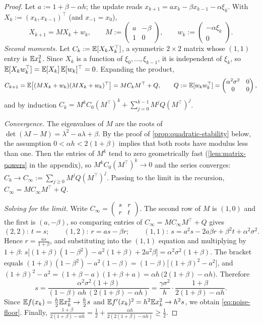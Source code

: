 \begin{proof}
Let $a:=1+\beta-\alpha h$; the update reads $x_{k+1}=ax_k-\beta x_{k-1}-\alpha\xi_k$. With
$X_k:=(x_k,x_{k-1})^\top$ (and $x_{-1}=x_0$),
\[
  X_{k+1}=MX_k+w_k,\qquad M:=\begin{pmatrix}a&-\beta\\1&0\end{pmatrix},\qquad
  w_k:=\begin{pmatrix}-\alpha\xi_k\\0\end{pmatrix}.
\]
\emph{Second moments.} Let $C_k:=\mathbb{E}[X_kX_k^\top]$, a symmetric $2\times2$ matrix whose
$(1,1)$ entry is $\mathbb{E} x_k^2$. Since $X_k$ is a function of $\xi_0,\dots,\xi_{k-1}$, it is
independent of $\xi_k$, so $\mathbb{E}[X_kw_k^\top]=\mathbb{E}[X_k]\,\mathbb{E}[w_k]^\top=0$. Expanding the product,
\[
  C_{k+1}=\mathbb{E}\bigl[(MX_k+w_k)(MX_k+w_k)^\top\bigr]=MC_kM^\top+Q,\qquad
  Q:=\mathbb{E}[w_kw_k^\top]=\begin{pmatrix}\alpha^2\sigma^2&0\\0&0\end{pmatrix},
\]
and by induction $C_k=M^kC_0(M^\top)^k+\sum_{j=0}^{k-1}M^jQ(M^\top)^j$.

\emph{Convergence.} The eigenvalues of $M$ are the roots of
$\det(\lambda I-M)=\lambda^2-a\lambda+\beta$. By the proof of
\cref{prop:quadratic-stability} below, the assumption $0<\alpha h<2(1+\beta)$ implies that
both roots have modulus less than one. Then the entries of $M^k$ tend to zero
geometrically fast (\cref{lem:matrix-powers} in the appendix), so
$M^kC_0(M^\top)^k\to0$ and the series converges: $C_k\to C_\infty:=\sum_{j\ge0}M^jQ(M^\top)^j$.
Passing to the limit in the recursion, $C_\infty=MC_\infty M^\top+Q$.

\emph{Solving for the limit.} Write $C_\infty=\begin{pmatrix}s&r\\r&t\end{pmatrix}$. The
second row of $M$ is $(1,0)$ and the first is $(a,-\beta)$, so comparing entries of
$C_\infty=MC_\infty M^\top+Q$ gives
\[
  (2,2):\ t=s;\qquad (1,2):\ r=as-\beta r;\qquad (1,1):\ s=a^2s-2a\beta r+\beta^2t+\alpha^2\sigma^2 .
\]
Hence $r=\frac{as}{1+\beta}$, and substituting into the $(1,1)$ equation and multiplying by
$1+\beta$:
$s\bigl[(1+\beta)(1-\beta^2)-a^2(1+\beta)+2a^2\beta\bigr]=\alpha^2\sigma^2(1+\beta)$. The
bracket equals $(1+\beta)(1-\beta^2)-a^2(1-\beta)=(1-\beta)\bigl[(1+\beta)^2-a^2\bigr]$, and
$(1+\beta)^2-a^2=(1+\beta-a)(1+\beta+a)=\alpha h\,\bigl(2(1+\beta)-\alpha h\bigr)$. Therefore
\[
  s=\frac{\alpha^2\sigma^2(1+\beta)}{(1-\beta)\,\alpha h\,(2(1+\beta)-\alpha h)}
   =\frac{\gamma\sigma^2}{h}\cdot\frac{1+\beta}{2(1+\beta)-\alpha h}.
\]
Since $\mathbb{E} f(x_k)=\frac h2\mathbb{E} x_k^2\to\frac h2 s$ and $\mathbb{E} f'(x_k)^2=h^2\mathbb{E} x_k^2\to h^2s$, we
obtain \eqref{eq:noise-floor}. Finally,
$\frac{1+\beta}{2(1+\beta)-\alpha h}=\frac12+\frac{\alpha h}{2(2(1+\beta)-\alpha h)}\ge\frac12$.
\end{proof}


